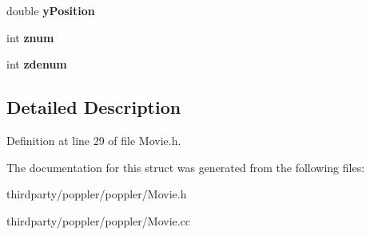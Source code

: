 \begin{DoxyCompactItemize}
\item 
\mbox{\label{struct_movie_activation_parameters_a459bff965736b31c8da600d5a15e0feb}} 
double {\bfseries y\+Position}
\item 
\mbox{\label{struct_movie_activation_parameters_aec69fd54ec19521b4e439614497a5daa}} 
int {\bfseries znum}
\item 
\mbox{\label{struct_movie_activation_parameters_aba3ba696e84c8f250828ba6e75df235d}} 
int {\bfseries zdenum}
\end{DoxyCompactItemize}


\subsection{Detailed Description}


Definition at line 29 of file Movie.\+h.



The documentation for this struct was generated from the following files\+:\begin{DoxyCompactItemize}
\item 
thirdparty/poppler/poppler/Movie.\+h\item 
thirdparty/poppler/poppler/Movie.\+cc\end{DoxyCompactItemize}
